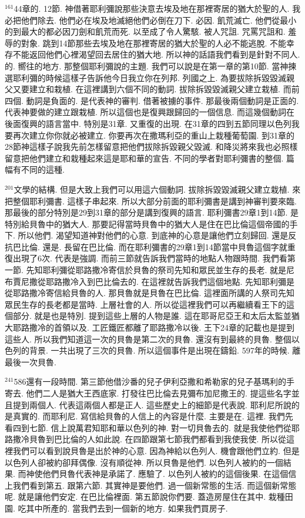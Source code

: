 \documentclass{book}
\begin{document}
$^{161}$44章的.
12節.
神借著耶利彌說那些決意去埃及地在那裡寄居的猶大於聖的人.
我必把他們除去.
他們必在埃及地滅絕他們必倒在刀下.
必因.
飢荒滅亡.
他們從最小的到最大的都必因刀劍和飢荒而死.
以至成了令人驚駭.
被人咒詛.
咒罵咒詛和.
羞辱的對象.
跳到14節那些去埃及地在那裡寄居的猶大於聖的人必不能逃脫.
不能幸存不能返回他們心裡渴望回去居住的猶大地.
所以神的話語我們看到是針對不同人.
的.
嚮往的地方.
那整個耶利彌說的主題.
我們可以說是在第一章的第10節.
當神揀選耶利彌的時候這樣子告訴他今日我立你在列邦.
列國之上.
為要拔除拆毀毀滅親父又要建立和栽植.
在這裡講到六個不同的動詞.
拔除拆毀毀滅親父建立栽植.
而前四個.
動詞是負面的.
是代表神的審判.
借著被擄的事件.
那最後兩個動詞是正面的.
代表神要做的建立跟栽植.
所以這個也是復興跟歸回的一個信息.
而這幾個動詞在後面復興的語言當中.
特別是31章.
又重復的出現.
在31章的四到五節同理以色列我要再次建立你你就必被建立.
你要再次在撒瑪利亞的重山上栽種葡萄園.
到31章的28節神這樣子說我先前怎樣留意把他們拔除拆毀親父毀滅.
和降災將來我也必照樣留意把他們建立和栽種起來這是耶和華的宣告.
不同的學者對耶利彌書的整個.
篇幅有不同的這種.

$^{201}$文學的結構.
但是大致上我們可以用這六個動詞.
拔除拆毀毀滅親父建立栽植.
來把整個耶利彌書.
這樣子串起來.
所以大部分前面的耶利彌書是講到神審判要來臨.
那最後的部分特別是29到31章的部分是講到復興的語言.
耶利彌書29章1到14節.
是特別給貝魯中的猶大人.
那要記得當時貝魯中的猶大人是住在巴比倫這個帝國的手下.
所以他們.
渴望知道神對他們的心意.
到底神的心意是讓他們立刻歸回.
還是反抗巴比倫.
還是.
長留在巴比倫.
而在耶利彌書的29章1到14節當中貝魯這個字就重復出現了6次.
代表是強調.
而前三節就告訴我們當時的地點人物跟時間.
我們看第一節.
先知耶利彌從耶路撒冷寄信於貝魯的祭司先知和眾民並生存的長老.
就是尼布賈尼撒從耶路撒冷入到巴比倫去的.
在這裡就告訴我們這個地點.
先知耶利彌是從耶路撒冷寄信給貝魯的人.
那貝魯就是貝魯在巴比倫.
這裡面所講的人祭司先知眾民生存的長老都是當時.
上層社會的人.
所以從這裡我們可以再繼續看王下的這個部分.
就是也是特別.
提到這些上層的人物是誰.
這在耶哥尼亞王和太后太監並猶大耶路撒冷的首領以及.
工匠鐵匠都離了耶路撒冷以後.
王下24章的記載也是提到這些人.
所以我們知道這一次的貝魯是第二次的貝魯.
還沒有到最終的貝魯.
整個以色列的背景.
一共出現了三次的貝魯.
所以這個事件是出現在鑄鉛.
597年的時候.
離最後一次貝魯.

$^{241}$586還有一段時間.
第三節他借沙番的兒子伊利亞撒和希勒家的兒子基瑪利的手寄去.
他們二人是猶大王西底家.
打發往巴比倫去見彌布加尼撒王的.
提這些名字並且提到兩個人.
代表這兩個人都是正人.
這些歷史上的細節是代表說.
耶利尼所說的是真實的.
而耶利尼.
寫信給貝魯的人信上的內容是什麼.
主要是在.
這裡.
我們先看四到七節.
信上說萬君知耶和華以色列的神.
對一切貝魯去的.
就是我使他們從耶路撒冷貝魯到巴比倫的人如此說.
在四節跟第七節我們都看到我使我使.
所以從這裡我們可以看到說貝魯是出於神的心意.
因為神給以色列人.
機會跟他們立約.
但是以色列人卻被約卻拜偶像.
沒有順從神.
所以貝魯是他們.
以色列人被約的一個結果.
而神使他們貝魯代表神是承諾了.
應驗了.
以色列人被約的這個後果.
在這個信上我們看到第五.
跟第六節.
其實神是要他們.
過一個新常態的生活.
而這個新常態呢.
就是讓他們安定.
在巴比倫裡面.
第五節說你們要.
蓋造房屋住在其中.
栽種田園.
吃其中所產的.
當我們去到一個新的地方.
如果我們買房子.
\end{document}
